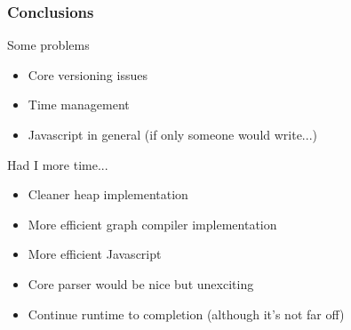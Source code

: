 \documentclass{beamer}
\begin{document}
\begin{frame}
	\frametitle{Conclusions}
	Some problems
	\begin{itemize}
		\item Core versioning issues
		\item Time management
		\item Javascript in general (if only someone would
		      write...)
	\end{itemize}	
	Had I more time...
	\begin{itemize}
		\item Cleaner heap implementation
		\item More efficient graph compiler implementation
		\item More efficient Javascript
		\item Core parser would be nice but unexciting
		\item Continue runtime to completion (although it's not
			  far off)
	\end{itemize}
	
\end{frame}
\end{document}
